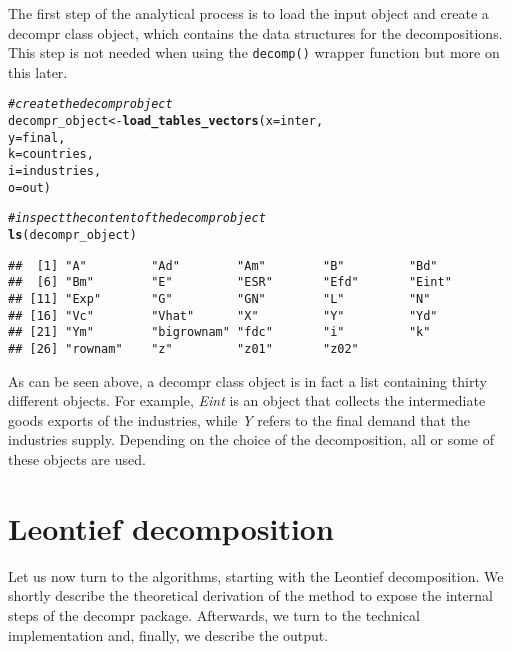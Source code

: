 \documentclass[a4paper]{article}\usepackage[]{graphicx}\usepackage[]{color}
\makeatletter
\newcommand{\hlcom}[1]{\textcolor[rgb]{0.678,0.584,0.686}{\textit{#1}}}%
\newcommand{\hlstd}[1]{\textcolor[rgb]{0.345,0.345,0.345}{#1}}%
\newcommand{\hlkwb}[1]{\textcolor[rgb]{0.69,0.353,0.396}{#1}}%
\newcommand{\hlkwc}[1]{\textcolor[rgb]{0.333,0.667,0.333}{#1}}%
\newcommand{\hlkwd}[1]{\textcolor[rgb]{0.737,0.353,0.396}{\textbf{#1}}}%
\newenvironment{kframe}{%
 \def\at@end@of@kframe{}%
 \ifinner\ifhmode%
  \def\at@end@of@kframe{\end{minipage}}%
  \begin{minipage}{\columnwidth}%
 \fi\fi%
 \def\FrameCommand##1{\hskip\@totalleftmargin \hskip-\fboxsep
 \colorbox{shadecolor}{##1}\hskip-\fboxsep
     \hskip-\linewidth \hskip-\@totalleftmargin \hskip\columnwidth}%
 \MakeFramed {\advance\hsize-\width
   \@totalleftmargin\z@ \linewidth\hsize
   \@setminipage}}%
 {\par\unskip\endMakeFramed%
 \at@end@of@kframe}
\newenvironment{knitrout}{}{} %
\newcommand{\code}[1]{\texttt{#1}}
\makeatother
\begin{document}
The first step of the analytical process is to load the input object
and create a decompr class object, which contains the data structures
for the decompositions. This step is not needed when using the \code{decomp()}
wrapper function but more on this later.

\begin{knitrout}
\color{fgcolor}\begin{kframe}
\begin{alltt}
\hlcom{# create the decompr object}
\hlstd{decompr_object} \hlkwb{<-} \hlkwd{load_tables_vectors}\hlstd{(} \hlkwc{x} \hlstd{= inter,}
                                       \hlkwc{y} \hlstd{= final,}
                                       \hlkwc{k} \hlstd{= countries,}
                                       \hlkwc{i} \hlstd{= industries,}
                                       \hlkwc{o} \hlstd{= out        )}

\hlcom{# inspect the content of the decompr object}
\hlkwd{ls}\hlstd{(decompr_object)}
\end{alltt}
\begin{verbatim}
##  [1] "A"         "Ad"        "Am"        "B"         "Bd"       
##  [6] "Bm"        "E"         "ESR"       "Efd"       "Eint"     
## [11] "Exp"       "G"         "GN"        "L"         "N"        
## [16] "Vc"        "Vhat"      "X"         "Y"         "Yd"       
## [21] "Ym"        "bigrownam" "fdc"       "i"         "k"        
## [26] "rownam"    "z"         "z01"       "z02"
\end{verbatim}
\end{kframe}
\end{knitrout}

As can be seen above, a decompr class object is in fact a list containing
thirty different objects. For example, \textit{Eint} is an object
that collects the intermediate goods exports of the industries, while
\textit{Y} refers to the final demand that the industries supply.
Depending on the choice of the decomposition, all or some of these
objects are used.

\section{Leontief decomposition}

\label{sec:leontief}Let us now turn to the algorithms, starting with
the Leontief decomposition. We shortly describe the theoretical derivation
of the method to expose the internal steps of the decompr package.
Afterwards, we turn to the technical implementation and, finally,
we describe the output.
\end{document}
